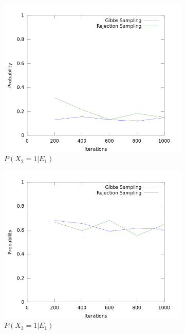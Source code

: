 \documentclass[11pt]{article}
\begin{document}
\begin{figure}
\begin{subfigure}[b]{0.49\textwidth}
	\includegraphics[width=\textwidth]{ian3.png}
	\caption{$P(X_2=1 | E_1) $}
\end{subfigure}
\begin{subfigure}[b]{0.49\textwidth}
	\includegraphics[width=\textwidth]{ian4.png}
	\caption{$P(X_3=1 | E_1) $}
\end{subfigure}
\begin{subfigure}[b]{0.49\textwidth}

\end{subfigure}
\end{figure}
\end{document}
